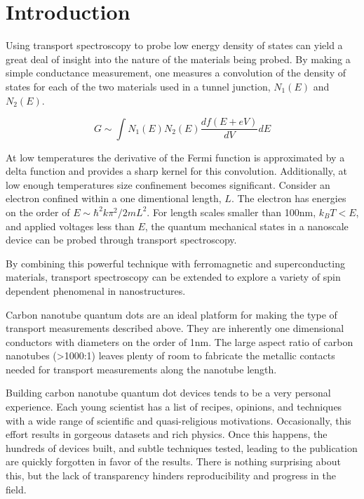 \chapter{Introduction}
\label{sec:intro}


Using transport spectroscopy to probe low energy density of states can yield a great deal of insight into the nature of the materials being probed. By making a simple conductance measurement, one measures a convolution of the density of states for each of the two materials used in a tunnel junction, $N_1(E)$ and $N_2(E)$.

\begin{equation}
    \label{eq:conductance}
    G \sim \int N_1(E) N_2(E)\frac{df(E+eV)}{dV}dE
\end{equation}

At low temperatures the derivative of the Fermi function is approximated by a delta function and provides a sharp kernel for this convolution. Additionally, at low enough temperatures size confinement becomes significant. Consider an electron confined within a one dimentional length, $L$. The electron has energies on the order of $E \sim \hbar^2k \pi^2/2mL^2$. For length scales smaller than 100nm, $k_B T < E$, and applied voltages less than $E$, the quantum mechanical states in a nanoscale device can be probed through transport spectroscopy.

By combining this powerful technique with ferromagnetic and superconducting materials, transport spectroscopy can be extended to explore a variety of spin dependent phenomenal in nanostructures. 

Carbon nanotube quantum dots are an ideal platform for making the type of transport measurements described above. They are inherently one dimensional conductors with diameters on the order of 1nm. The large aspect ratio of carbon nanotubes (>1000:1) leaves plenty of room to fabricate the metallic contacts needed for transport measurements along the nanotube length.

Building carbon nanotube quantum dot devices tends to be a very personal experience. Each young scientist has a list of recipes, opinions, and techniques with a wide range of scientific and quasi-religious motivations. Occasionally, this effort results in gorgeous datasets and rich physics. Once this happens, the hundreds of devices built, and subtle techniques tested, leading to the publication are quickly forgotten in favor of the results. There is nothing surprising about this, but the lack of transparency hinders reproducibility and progress in the field.

